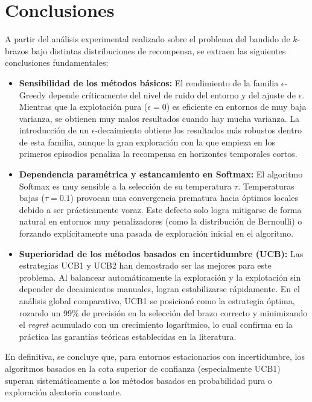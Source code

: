 \section{Conclusiones}

A partir del análisis experimental realizado sobre el problema del bandido de $k$-brazos bajo distintas distribuciones de recompensa, se extraen las siguientes conclusiones fundamentales:

\begin{itemize}
    \item \textbf{Sensibilidad de los métodos básicos:} El rendimiento de la familia $\epsilon$-Greedy depende 
    críticamente del nivel de ruido del entorno y del ajuste de $\epsilon$. Mientras que la explotación pura 
    ($\epsilon=0$) es eficiente en entornos de muy baja varianza, se obtienen muy malos resultados cuando hay mucha varianza. 
    La introducción de un $\epsilon$-decaimiento obtiene los resultados más robustos dentro de esta familia, aunque 
    la gran exploración con la que empieza en los primeros episodios penaliza la recompensa en horizontes temporales cortos.
    
    \item \textbf{Dependencia paramétrica y estancamiento en Softmax:} El algoritmo Softmax es muy sensible a 
    la selección de su temperatura $\tau$. Temperaturas bajas ($\tau=0.1$) provocan una convergencia prematura hacia 
    óptimos locales debido a ser prácticamente voraz. Este defecto solo logra mitigarse de forma natural en entornos
     muy penalizadores (como la distribución de Bernoulli) o forzando explícitamente una pasada de 
    exploración inicial en el algoritmo. 
    
    \item \textbf{Superioridad de los métodos basados en incertidumbre (UCB):} Las estrategias UCB1 y 
    UCB2 han demostrado ser las mejores para este problema. Al balancear automáticamente la 
    exploración y la explotación sin depender de decaimientos manuales, logran estabilizarse 
    rápidamente. En el análisis global comparativo, UCB1 se posicionó como la estrategia óptima, 
    rozando un 99\% de precisión en la selección del brazo correcto y minimizando el \textit{regret} 
    acumulado con un crecimiento logarítmico, lo cual confirma en la práctica las garantías 
    teóricas establecidas en la literatura.
\end{itemize}



En definitiva, se concluye que, para entornos estacionarios con incertidumbre, los algoritmos basados 
en la cota superior de confianza (especialmente UCB1) superan sistemáticamente a los métodos basados 
en probabilidad pura o exploración aleatoria constante.
